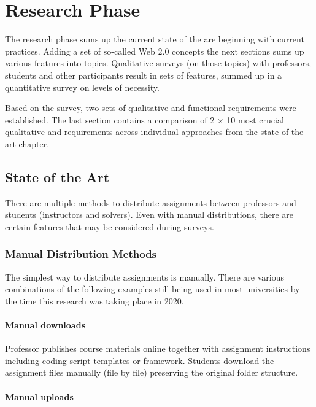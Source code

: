 \chapter{Research Phase} \label{chap:research}

{The research phase sums up the current state of the are beginning with current practices. Adding a set of so-called Web 2.0 concepts the next sections sums up various features into topics. Qualitative surveys (on those topics) with professors, students and other participants result in sets of features, summed up in a quantitative survey on levels of necessity.}

{Based on the survey, two sets of qualitative and functional requirements were established. The last section contains a comparison of 2 × 10 most crucial qualitative and requirements across individual approaches from the state of the art chapter.}

\section{State of the Art} \label{sec:sota}

{There are multiple methods to distribute assignments between professors and students (instructors and solvers). Even with manual distributions, there are certain features that may be considered during surveys.}

\subsection{Manual Distribution Methods} \label{ssec:manual}

{The simplest way to distribute assignments is manually. There are various combinations of the following examples still being used in most universities by the time this research was taking place in 2020.}

\subsubsection{Manual downloads}

{Professor publishes course materials online together with assignment instructions including coding script templates or framework. Students download the assignment files manually (file by file) preserving the original folder structure.}

\subsubsection{Manual uploads}

